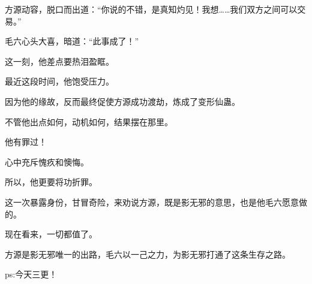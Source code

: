 \begin{this_body}
方源动容，脱口而出道：“你说的不错，是真知灼见！我想……我们双方之间可以交易。”

毛六心头大喜，暗道：“此事成了！”

这一刻，他差点要热泪盈眶。

最近这段时间，他饱受压力。

因为他的缘故，反而最终促使方源成功渡劫，炼成了变形仙蛊。

不管他出点如何，动机如何，结果摆在那里。

他有罪过！

心中充斥愧疚和懊悔。

所以，他更要将功折罪。

这一次暴露身份，甘冒奇险，来劝说方源，既是影无邪的意思，也是他毛六愿意做的。

现在看来，一切都值了。

方源是影无邪唯一的出路，毛六以一己之力，为影无邪打通了这条生存之路。

ps:今天三更！

\end{this_body}

